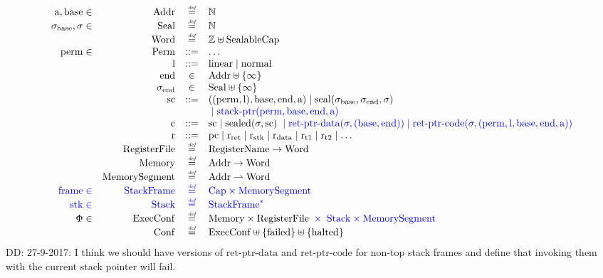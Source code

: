 \documentclass[a3paper]{article}
\newcommand\lau[1]{{\color{purple} \sf \footnotesize {LS: #1}}\\}
\newcommand\dominique[1]{{\color{purple} \sf \footnotesize {DD: #1}}\\}
\newcommand{\defeq}{\stackrel{\textit{\tiny{def}}}{=}}
\newcommand{\defbnf}{::=}
\newcommand{\fun}{\rightarrow}
\newcommand{\parfun}{\rightharpoonup}
\newcommand{\sourcecolor}{\color{blue}}
\newcommand{\src}[1]{{\sourcecolor #1}}
\newcommand{\nats}{\mathbb{N}}
\newcommand{\ints}{\mathbb{Z}}
\newcommand{\shareddom}[1]{\mathrm{#1}}
\newcommand{\RegName}{\shareddom{RegisterName}}
\newcommand{\Addr}{\shareddom{Addr}}
\newcommand{\Seal}{\shareddom{Seal}}
\newcommand{\Perm}{\shareddom{Perm}}
\newcommand{\Caps}{\shareddom{Cap}}
\newcommand{\SealableCaps}{\shareddom{SealableCap}}
\newcommand{\Word}{\shareddom{Word}}
\newcommand{\Mem}{\shareddom{Memory}}
\newcommand{\Reg}{\shareddom{RegisterFile}}
\newcommand{\Conf}{\shareddom{Conf}}
\newcommand{\ExecConf}{\shareddom{ExecConf}}
\newcommand{\MemSeg}{\shareddom{MemorySegment}}
\newcommand{\StkFrame}{\shareddom{StackFrame}}
\newcommand{\Stack}{\shareddom{Stack}}
\newcommand{\scbnf}{\shareddom{sc}}
\newcommand{\cbnf}{\shareddom{c}}
\newcommand{\permbnf}{\shareddom{perm}}
\newcommand{\addrbnf}{\shareddom{a}}
\newcommand{\basebnf}{\shareddom{base}}
\newcommand{\aendbnf}{\shareddom{end}}
\newcommand{\rbnf}{\shareddom{r}}
\newcommand{\linbnf}{\shareddom{l}}
\newcommand{\sealbasebnf}{\sigma_\shareddom{base}}
\newcommand{\sealendbnf}{\sigma_\shareddom{end}}
\newcommand{\sstk}{\shareddom{stk}}
\newcommand{\sstkframe}{\shareddom{frame}}
\newcommand{\stkptr}[1]{\mathrm{stack\text{-}ptr}(#1)}
\newcommand{\retptrd}{\mathrm{ret\text{-}ptr\text{-}data}}
\newcommand{\retptrc}{\mathrm{ret\text{-}ptr\text{-}code}}
\newcommand{\seal}[1]{\shareddom{seal}(#1)}
\newcommand{\sealed}[1]{\shareddom{sealed}(#1)}
\newcommand{\failed}{\mathrm{failed}}
\newcommand{\halted}{\mathrm{halted}}
\newcommand{\pcreg}{\mathrm{pc}}
\newcommand{\rstk}{\mathrm{r}_\mathrm{stk}}
\newcommand{\rO}{\mathrm{r}_\mathrm{ret}}
\newcommand{\rret}{\rO}
\newcommand{\rdata}{\mathrm{r}_\mathrm{data}}
\newcommand{\rtmp}[1]{\mathrm{r}_\mathrm{t#1}}
\newcommand{\plainlinearity}[1]{\mathrm{#1}}
\newcommand{\linear}{\plainlinearity{linear}}
\newcommand{\normal}{\plainlinearity{normal}}
\begin{document}
\[
  \begin{array}{rrcl}
   \addrbnf,\basebnf \in & \Addr & \defeq & \nats \\
    \sealbasebnf, \sigma \in & \Seal & \defeq & \nats \\
    &\Word & \defeq & \ints \uplus \SealableCaps\\
    \permbnf \in& \Perm & \defbnf & \dots \\
    &\linbnf & \defbnf & \linear \mid \normal \\
    &\aendbnf & \in & \Addr \uplus \{\infty \} \\
    &\sealendbnf & \in & \Seal \uplus \{\infty \} \\
    &\scbnf &\defbnf & ((\permbnf,\linbnf),\basebnf,\aendbnf,\addrbnf) \mid \seal{\sealbasebnf,\sealendbnf,\sigma}\\
    & & & {\sourcecolor{} \mid \stkptr{\permbnf,\basebnf,\aendbnf,\addrbnf}}\\ 
    &\cbnf & \defbnf &  \scbnf \mid \sealed{\sigma,\scbnf}{\sourcecolor{} \; \mid \retptrd(\sigma,(\basebnf,\aendbnf)) \mid \retptrc(\sigma,(\permbnf,\linbnf,\basebnf,\aendbnf,\addrbnf))}\\ 
    &\rbnf & \defbnf &\pcreg \mid \rret \mid \rstk \mid \rdata \mid \rtmp{1} \mid \rtmp{2} \mid \dots \\
    &\Reg & \defeq & \RegName \fun \Word\\
    &\Mem & \defeq & \Addr \fun \Word \\
    &\MemSeg & \defeq & \Addr \parfun \Word \\
    {\sourcecolor \sstkframe \in} & {\sourcecolor \StkFrame} & {\sourcecolor \defeq} & {\sourcecolor \Caps \times \MemSeg}\\
    \src{\sstk \in}& \src{ \Stack} & \src{ \defeq} & \src{ \StkFrame^*} \\
    \Phi \in & \ExecConf & \defeq & \Mem \times \Reg {\sourcecolor{} \; \times \; \Stack \times \MemSeg }\\
    &\Conf & \defeq & \ExecConf \uplus \{\failed\} \uplus \{\halted\}
  \end{array}
\]
\dominique{27-9-2017: I think we should have versions of $\retptrd$ and $\retptrc$ for non-top stack frames and define that invoking them with the current stack pointer will fail.}
\end{document}
